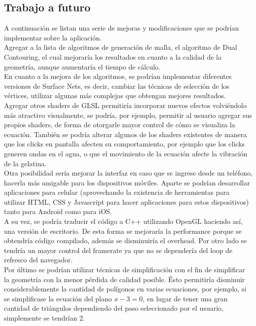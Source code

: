 \documentclass[12pt]{article}
\begin{document}
\subsection{Trabajo a futuro}
A continuación se listan una serie de mejoras y modificaciones que se podrían implementar sobre la aplicación.
\\Agregar a la lista de algoritmos de generación de malla, el algoritmo de Dual Contouring\cite{dualcontour}, el cual mejoraría los resultados en cuanto a la calidad de la geometría, aunque aumentaría el tiempo de cálculo. 
\\En cuanto a la mejora de los algoritmos, se podrían implementar diferentes versiones de Surface Nets, es decir, cambiar las técnicas de selección de los vértices, utilizar algunas más complejas que obtengan mejores resultados.
\\Agregar otros shaders de GLSL permitiría incorporar nuevos efectos volviéndolo más atractivo visualmente, se podría, por ejemplo, permitir al usuario agregar sus propios shaders, de forma de otorgarle  mayor control de cómo se visualiza la ecuación. También se podría alterar algunos de los shaders existentes de manera que los clicks en pantalla afecten su comportamiento, por ejemplo que los clicks generen ondas en el agua, o que el movimiento de la ecuación afecte la vibración de la gelatina.
\\Otra posibilidad sería mejorar la interfaz en caso que se ingrese desde un teléfono, hacerla más amigable para los dispositivos móviles.
Aparte se podrían desarrollar aplicaciones para celular (aprovechando la existencia de herramientas para utilizar HTML, CSS y Javascript para hacer aplicaciones para estos dispositivos) tanto para Android como para iOS. 
\\A su vez, se podría traducir el código a C++ utilizando OpenGL haciendo así, una versión de escritorio. De esta forma se mejoraría la performance porque se obtendría código compilado, además se disminuiría el overhead. Por otro lado se tendría un mayor control del framerate ya que no se dependería del loop de refresco del navegador.
\\Por último se podrían utilizar técnicas de simplificación\cite{simplificacion}\cite{realtimerendering} con el fin de simplificar la geometría con la menor pérdida de calidad posible. Ésto permitiría disminuir considerablemente la cantidad de polígonos en varias ecuaciones, por ejemplo, si se simplificase la ecuación del plano $x-3=0$, en lugar de tener una gran cantidad de triángulos dependiendo del paso seleccionado por el usuario, simplemente se tendrían 2.
\end{document}
